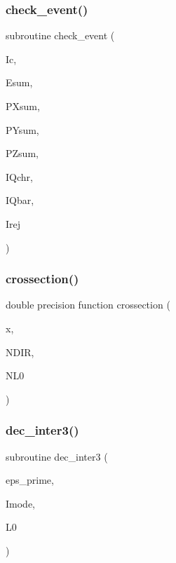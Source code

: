 \subsubsection{\texorpdfstring{check\+\_\+event()}{check\_event()}}
{\footnotesize\ttfamily subroutine check\+\_\+event (\begin{DoxyParamCaption}\item[{}]{Ic,  }\item[{}]{Esum,  }\item[{}]{P\+Xsum,  }\item[{}]{P\+Ysum,  }\item[{}]{P\+Zsum,  }\item[{}]{I\+Qchr,  }\item[{}]{I\+Qbar,  }\item[{}]{Irej }\end{DoxyParamCaption})}

\mbox{\label{sophia_8f_ad14b0ac258699da8b9e12c8a4704bbcd}} 
\subsubsection{\texorpdfstring{crossection()}{crossection()}}
{\footnotesize\ttfamily double precision function crossection (\begin{DoxyParamCaption}\item[{}]{x,  }\item[{}]{N\+D\+IR,  }\item[{}]{N\+L0 }\end{DoxyParamCaption})}

\mbox{\label{sophia_8f_a715d45a0bca6b97f99f062111397824a}} 
\subsubsection{\texorpdfstring{dec\+\_\+inter3()}{dec\_inter3()}}
{\footnotesize\ttfamily subroutine dec\+\_\+inter3 (\begin{DoxyParamCaption}\item[{}]{eps\+\_\+prime,  }\item[{}]{Imode,  }\item[{}]{L0 }\end{DoxyParamCaption})}


